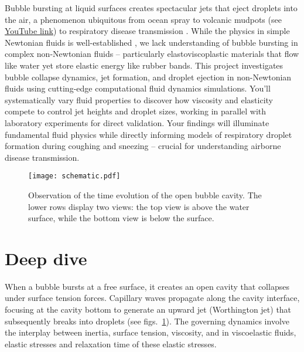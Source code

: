 \documentclass[a4paper,10pt]{article}
\begin{document}
Bubble bursting at liquid surfaces creates spectacular jets that eject droplets into the air, a phenomenon ubiquitous from ocean spray to volcanic mudpots (see \href{https://www.youtube.com/watch?v=a9hUsVq9q7U}{YouTube link}) to respiratory disease transmission \citep{walls2017quantifying,bourouiba2021fluid,sanjay_lohse_jalaal_2021,balasubramanianBurstingBubbleElastoviscoplastic2024,dixit2024viscoelastic}. While the physics in simple Newtonian fluids is well-established \citep{duchemin2002jet, walls2015jet, deike2018dynamics, gordillo2019capillary}, we lack understanding of bubble bursting in complex non-Newtonian fluids -- particularly elastoviscoplastic materials that flow like water yet store elastic energy like rubber bands. 
This project investigates bubble collapse dynamics, jet formation, and droplet ejection in non-Newtonian fluids using cutting-edge computational fluid dynamics simulations. 
You'll systematically vary fluid properties to discover how viscosity and elasticity compete to control jet heights and droplet sizes, working in parallel with laboratory experiments for direct validation. Your findings will illuminate fundamental fluid physics while directly informing models of respiratory droplet formation during coughing and sneezing -- crucial for understanding airborne disease transmission.

	
\begin{figure}[H]
\begin{center}
	\texttt{[image: schematic.pdf]}
	\caption{Observation of the time evolution of the open bubble cavity. The lower rows display two views: the top view is above the water surface, while the bottom view is below the surface. }
	\label{Figure::Waves}
\end{center}
\end{figure}

\section*{Deep dive}

When a bubble bursts at a free surface, it creates an open cavity that collapses under surface tension forces. Capillary waves propagate along the cavity interface, focusing at the cavity bottom to generate an upward jet (Worthington jet) that subsequently breaks into droplets (see figs.~\ref{Figure::Waves}). The governing dynamics involve the interplay between inertia, surface tension, viscosity, and in viscoelastic fluids, elastic stresses and relaxation time of these elastic stresses.
\end{document}
